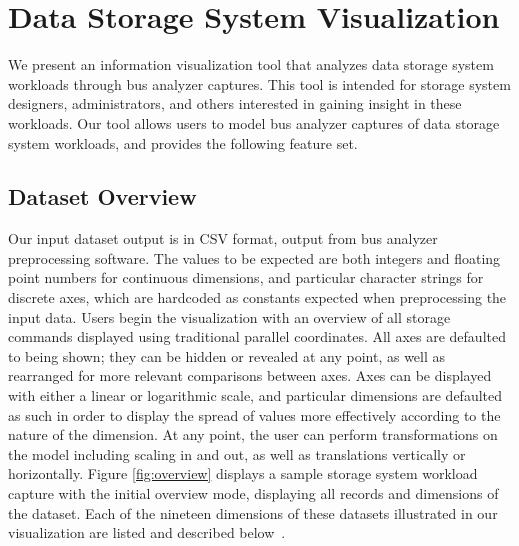 \documentclass[12pt]{ucthesis}
\begin{document}
\chapter{Data Storage System Visualization}
\label{data-storage-system-visualization}

We present an information visualization tool that analyzes data storage system workloads through bus analyzer captures. This tool is intended for storage system designers, administrators, and others interested in gaining insight in these workloads. Our tool allows users to model bus analyzer captures of data storage system workloads, and provides the following feature set.

\section{Dataset Overview}
Our input dataset output is in CSV format, output from bus analyzer preprocessing software. The values to be expected are both integers and floating point numbers for continuous dimensions, and particular character strings for discrete axes, which are hardcoded as constants expected when preprocessing the input data. Users begin the visualization with an overview of all storage commands displayed using traditional parallel coordinates. All axes are defaulted to being shown; they can be hidden or revealed at any point, as well as rearranged for more relevant comparisons between axes. Axes can be displayed with either a linear or logarithmic scale, and particular dimensions are defaulted as such in order to display the spread of values more effectively according to the nature of the dimension. At any point, the user can perform transformations on the model including scaling in and out, as well as translations vertically or horizontally. Figure \ref{fig:overview} displays a sample storage system workload capture with the initial overview mode, displaying all records and dimensions of the dataset. Each of the nineteen dimensions of these datasets illustrated in our visualization are listed and described below~\cite{internal:requirements}.
\end{document}
